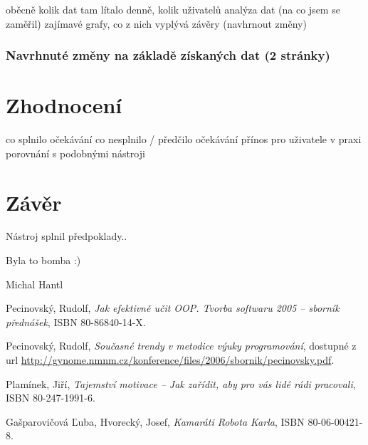 \documentclass[bc,female,java,dept456]{diploma}						%
\begin{document}
oběcně kolik dat tam lítalo denně, kolik uživatelů
analýza dat (na co jsem se zaměřil)
zajímavé grafy, co z nich vyplývá
závěry (navhrnout změny)

\subsubsection{Navrhnuté změny na základě získaných dat (2 stránky)}


\section{Zhodnocení}
co splnilo očekávání
co nesplnilo / předčilo očekávání
přínos pro uživatele v praxi
porovnání s podobnými nástroji




\section{Závěr}
\label{sec:Conclusion}

Nástroj splnil předpoklady..

Byla to bomba :)

\bigskip
\begin{flushright}
Michal Hantl
\end{flushright}









\begin{thebibliography}{99}


 Pecinovský, Rudolf,
\textit{Jak efektivně učit OOP. Tvorba softwaru 2005 – sborník přednášek}, ISBN 80-86840-14-X.

 Pecinovský, Rudolf,
\textit{Současné trendy v metodice výuky programování}, dostupné z url \url{http://gynome.nmnm.cz/konference/files/2006/sbornik/pecinovsky.pdf}.

 Plamínek, Jiří,
\textit{Tajemství motivace – Jak zařídit, aby pro vás lidé rádi pracovali}, ISBN 80-247-1991-6.

 Gašparovičová Ľuba, Hvorecký, Josef,
\textit{Kamaráti Robota Karla}, ISBN 80-06-00421-8.

\end{thebibliography}


\end{document}
